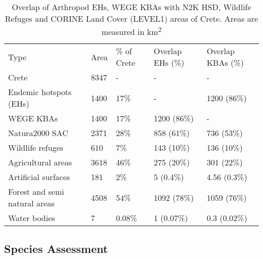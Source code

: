 \begin{table}[]
\caption{Overlap of Arthropod EHs, WEGE KBAs with N2K HSD, Wildlife Refuges and CORINE Land Cover (LEVEL1) areas of Crete. Areas are measured in km\textsuperscript{2}}
\begin{tabular}{lllll}
Type                          & Area       & \% of Crete & Overlap EHs (\%)                          & Overlap KBAs (\%)                  \\
Crete                         & 8347       & -           & -                                      & -                               \\
Endemic hotspots (EHs)        & 1400       & 17\%        & -                                      & 1200 (86\%)                     \\
WEGE KBAs                     & 1400       & 17\%        & 1200 (86\%)                            & -                               \\
Natura2000 SAC                & 2371       & 28\%        & 858 (61\%)                             & 736 (53\%)                      \\
Wildlife refuges              & 610        & 7\%         & 143 (10\%)                             & 136 (10\%)                      \\
Agricultural areas            & 3618       & 46\%        & 275 (20\%)                             & 301 (22\%)                      \\
Artificial surfaces           & 181        & 2\%         & 5 (0.4\%)                              & 4.56 (0.3\%)                    \\
Forest and semi natural areas & 4508       & 54\%        & 1092 (78\%)                            & 1059 (76\%)                     \\
Water bodies                  & 7          & 0.08\%      & 1 (0.07\%)                             & 0.3 (0.02\%)                   
\end{tabular}
\label{table:arthropods-overlaps}
\end{table}


    \subsection{Species Assessment}
    \label{subsec:arthropods-species-assessment}
    
